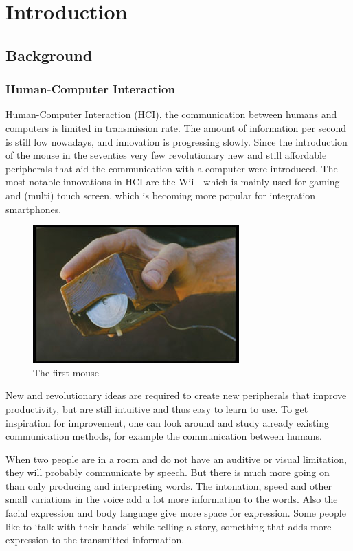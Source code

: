 
\chapter{Introduction}
\label{ch:intro}

\section{Background}
\subsection*{Human-Computer Interaction}
Human-Computer Interaction (HCI), the communication between humans and computers is limited in transmission rate. The amount of information per second is still low nowadays, and innovation is progressing slowly. Since the introduction of the mouse in the seventies very few revolutionary new and still affordable peripherals that aid the communication with a computer were introduced. The most notable innovations in HCI are the Wii - which is mainly used for gaming - and (multi) touch screen, which is becoming more popular for integration smartphones.

\begin{figure}[tb]
	\center{}
	\label{fig:mouse}
	\includegraphics[width=0.3\linewidth]{figures/mouse.jpg}
	\caption{The first mouse}
\end{figure}

New and revolutionary ideas are required to create new peripherals that improve productivity, but are still intuitive and thus easy to learn to use. To get inspiration for improvement, one can look around and study already existing communication methods, for example the communication between humans. 

When two people are in a room and do not have an auditive or visual limitation, they will probably communicate by speech. But there is much more going on than only producing and interpreting words. The intonation, speed and other small variations in the voice add a lot more information to the words. Also the facial expression and body language give more space for expression. Some people like to `talk with their hands' while telling a story, something that adds more expression to the transmitted information.

